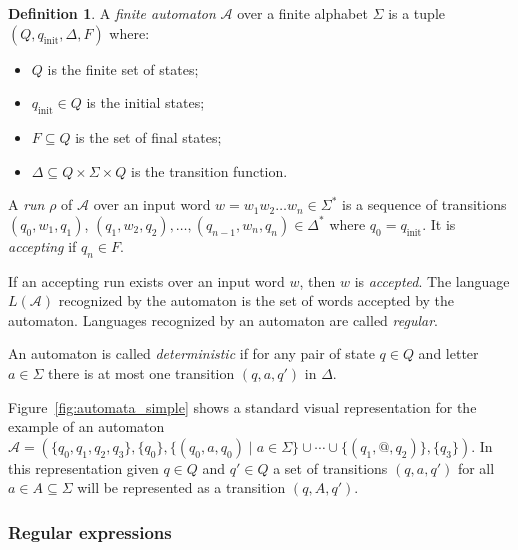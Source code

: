 \documentclass[11px]{article}
\theoremstyle{definition}
\newtheorem{definition}{Definition}
\begin{document}
      \begin{definition}
        A \textit{finite automaton} $\mathcal{A}$ over a finite alphabet
        $\Sigma$ is a tuple $(Q, q_\text{init}, \Delta, F)$ where:
          \begin{itemize}
            \item $Q$ is the finite set of states;
            \item $q_\text{init} \in Q$ is the initial states;
            \item $F \subseteq Q$ is the set of final states;
            \item $\Delta \subseteq Q \times \Sigma \times Q$ is the transition
              function.
          \end{itemize}

          A \textit{run} $\rho$ of $\mathcal{A}$ over an input word $w= w_1 w_2
          \ldots w_n \in \Sigma^*$ is a sequence of transitions $(q_0, w_1,
          q_1)$, $(q_1, w_2, q_2), \ldots, (q_{n-1}, w_n, q_n) \in \Delta^*$
          where $q_0 = q_\text{init}$. It is \textit{accepting} if $q_n \in F$.

          If an accepting run exists over an input word $w$, then $w$ is
          \textit{accepted}. The language $L(\mathcal{A})$ recognized by the
          automaton is the set of words accepted by the automaton. Languages
          recognized by an automaton are called \textit{regular}.

          An automaton is called \textit{deterministic} if for any pair of
          state $q \in Q$ and letter $a \in \Sigma$ there is at most one
          transition $(q, a, q')$ in $\Delta$.
        \end{definition}

        Figure~\ref{fig:automata_simple} shows a standard visual representation
        for the example of an automaton $\mathcal{A} = (\{q_0, q_1, q_2, q_3\},
        \{q_0\}, \{(q_0, a, q_0)\mid a \in \Sigma\} \cup \cdots \cup \{(q_1,
        \texttt{@}, q_2)\},\{q_3\})$. In this representation given $q \in Q$
        and $q' \in Q$ a set of transitions $(q, a, q')$ for all $a \in A
        \subseteq \Sigma$ will be represented as a transition $(q, A, q')$.

      \subsubsection{Regular expressions}%
        \label{sec:def:regex}
\end{document}
